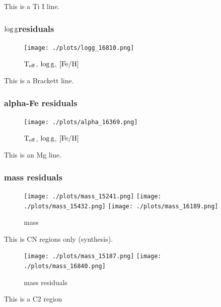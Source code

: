 \documentclass[12pt, preprint]{aastex}
\newcommand{\teff}{\mbox{$\rm T_{eff}$}}
\newcommand{\feh}{\mbox{$\rm [Fe/H]$}}
\newcommand{\logg}{\mbox{$\rm \log g$}}
\begin{document}
This is a Ti I line. \\


\subsubsection{\logg residuals}

\begin{figure}[p!]
\centering
    \texttt{[image: ./plots/logg\_16810.png]}
  \caption{\teff, \logg, \feh}
\label{fig:validation}
\end{figure}

This is a Brackett line. \\

\subsubsection{alpha-Fe residuals}

\begin{figure}[p!]
\centering
    \texttt{[image: ./plots/alpha\_16369.png]}
  \caption{\teff, \logg, \feh}
\label{fig:validation}
\end{figure}

This is an Mg line. \\

\subsubsection{mass residuals}

\begin{figure}[p!]
\centering
    \texttt{[image: ./plots/mass\_15241.png]}
        \texttt{[image: ./plots/mass\_15432.png]}
               \texttt{[image: ./plots/mass\_16189.png]}
  \caption{mass}
\label{fig:validation}
\end{figure}

This is CN regions only (synthesis). \\

\begin{figure}[p!]
\centering
    \texttt{[image: ./plots/mass\_15187.png]}
        \texttt{[image: ./plots/mass\_16840.png]}
  \caption{mass residuals}
\label{fig:validation}
\end{figure}

This is a C2 region \\
\end{document}
